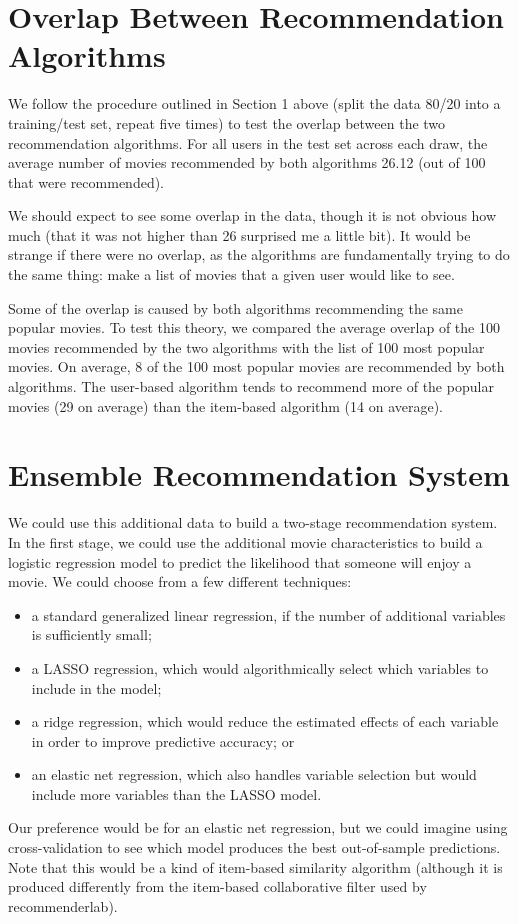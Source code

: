 \section{Overlap Between Recommendation Algorithms} %

We follow the procedure outlined in Section 1 above (split the data 80/20 into a training/test set, repeat five times) to test the overlap between the two recommendation algorithms. For all users in the test set across each draw, the average number of movies recommended by both algorithms 26.12 (out of 100 that were recommended).

We should expect to see some overlap in the data, though it is not obvious how much (that it was not higher than 26 surprised me a little bit). It would be strange if there were no overlap, as the algorithms are fundamentally trying to do the same thing: make a list of movies that a given user would like to see. 

Some of the overlap is caused by both algorithms recommending the same popular movies. To test this theory, we compared the average overlap of the 100 movies recommended by the two algorithms with the list of 100 most popular movies. On average, 8 of the 100 most popular movies are recommended by both algorithms. The user-based algorithm tends to recommend more of the popular movies (29 on average) than the item-based algorithm (14 on average).

\section{Ensemble Recommendation System} %

We could use this additional data to build a two-stage recommendation system. In the first stage, we could use the additional movie characteristics to build a logistic regression model to predict the likelihood that someone will enjoy a movie. We could choose from a few different techniques:
\begin{itemize}
\item a standard generalized linear regression, if the number of additional variables is sufficiently small;
\item a LASSO regression, which would algorithmically select which variables to include in the model;
\item a ridge regression, which would reduce the estimated effects of each variable in order to improve predictive accuracy; or
\item an elastic net regression, which also handles variable selection but would include more variables than the LASSO model.
\end{itemize}
Our preference would be for an elastic net regression, but we could imagine using cross-validation to see which model produces the best out-of-sample predictions. Note that this would be a kind of item-based similarity algorithm (although it is produced differently from the item-based collaborative filter used by \textsf{recommenderlab}).

